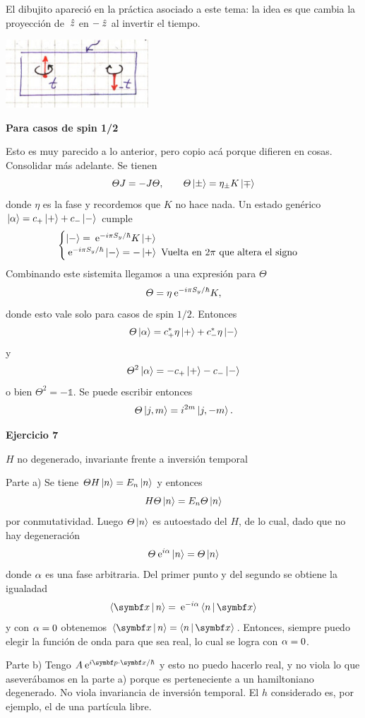 \documentclass[10pt,oneside]{CBFT_book}
\begin{document}
El dibujito apareció en la práctica asociado a este tema: la idea es que cambia la proyección de
$\:\hat{z}$ en $-\:\hat{z}$ al invertir el tiempo.

\includegraphics[width=0.4\textwidth]{images/fig_ft2_extra_practica_desconocido.jpg}

\begin{ejemplo}{\bf Para casos de spin 1/2}

Esto es muy parecido a lo anterior, pero copio acá porque difieren en cosas. Consolidar más adelante.
Se tienen
\[
	\Theta J = - J \Theta, \qquad \Theta\Ket{\pm}  = \eta_{\pm} K \Ket{\mp}
\]
donde $\eta$ es la fase y recordemos que $K$ no hace nada. 
Un estado genérico $\Ket{\alpha} = c_+ \Ket{+} + c_- \Ket{-}$ cumple
\[
	\begin{cases}
		\Ket{-} = \:\mathrm{e}^{ - i \pi S_y / \hbar } K \Ket{+} \\
		\:\mathrm{e}^{ - i \pi S_y / \hbar } \Ket{-} = - \Ket{+} \text{ Vuelta en $2\pi$ que altera el signo} 
	\end{cases}
\]
Combinando este sistemita llegamos a una expresión para $\Theta$
\[
	\Theta = \eta \:\mathrm{e}^{ - i \pi S_y / \hbar } K,
\]
donde esto vale solo para casos de spin $1/2$. Entonces
\[
	\Theta\Ket{\alpha} = c_+^* \eta \Ket{+} + c_-^* \eta \Ket{-}
\]
y
\[
	\Theta^2 \Ket{\alpha} = -c_+ \Ket{+} - c_- \Ket{-}
\]
o bien $\Theta^2 = - \mathbb{1}$. Se puede escribir entonces
\[
	\Theta\Ket{j,m} = i^{2m} \Ket{j,-m} .
\]
\end{ejemplo}

\begin{ejemplo}{\bf Ejercicio 7}

$H$ no degenerado, invariante frente a inversión temporal

Parte a) 
Se tiene $ \Theta H \Ket{n} = E_n \Ket{n} $ y entonces
\[
	H \Theta \Ket{n} = E_n \Theta \Ket{n}
\]
por conmutatividad. Luego $\Theta \Ket{n} $ es autoestado del $H$, de lo cual, dado que no hay degeneración
\[
	\Theta \:\mathrm{e}^{i\alpha} \Ket{n} = \Theta \Ket{n}
\]
donde $\alpha$ es una fase arbitraria. Del primer punto y del segundo se obtiene la igualadad
\[
	\Braket{\vbx | n } = \euler^{-i\a} \Braket{n|\vbx}
\]
y con $\alpha=0$ obtenemos $\Braket{\vbx | n } = \Braket{n|\vbx}$.
Entonces, siempre puedo elegir la función de onda para que sea real, lo cual se logra con $\alpha=0$.

Parte b) 
Tengo $A \euler^{ i \pe{p}{x} / \hbar }$ y esto no puedo hacerlo real, y no viola lo que aseverábamos en la parte a)
porque es perteneciente a un hamiltoniano degenerado.
No viola invariancia de inversión temporal. El $h$ considerado es, por ejemplo, el de una partícula libre.
 
\end{ejemplo}
\end{document}
